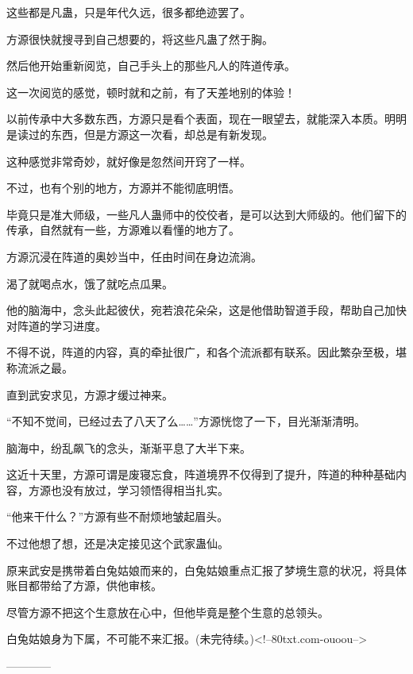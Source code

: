 \begin{this_body}
这些都是凡蛊，只是年代久远，很多都绝迹罢了。

方源很快就搜寻到自己想要的，将这些凡蛊了然于胸。

然后他开始重新阅览，自己手头上的那些凡人的阵道传承。

这一次阅览的感觉，顿时就和之前，有了天差地别的体验！

以前传承中大多数东西，方源只是看个表面，现在一眼望去，就能深入本质。明明是读过的东西，但是方源这一次看，却总是有新发现。

这种感觉非常奇妙，就好像是忽然间开窍了一样。

不过，也有个别的地方，方源并不能彻底明悟。

毕竟只是准大师级，一些凡人蛊师中的佼佼者，是可以达到大师级的。他们留下的传承，自然就有一些，方源难以看懂的地方了。

方源沉浸在阵道的奥妙当中，任由时间在身边流淌。

渴了就喝点水，饿了就吃点瓜果。

他的脑海中，念头此起彼伏，宛若浪花朵朵，这是他借助智道手段，帮助自己加快对阵道的学习进度。

不得不说，阵道的内容，真的牵扯很广，和各个流派都有联系。因此繁杂至极，堪称流派之最。

直到武安求见，方源才缓过神来。

“不知不觉间，已经过去了八天了么……”方源恍惚了一下，目光渐渐清明。

脑海中，纷乱飙飞的念头，渐渐平息了大半下来。

这近十天里，方源可谓是废寝忘食，阵道境界不仅得到了提升，阵道的种种基础内容，方源也没有放过，学习领悟得相当扎实。

“他来干什么？”方源有些不耐烦地皱起眉头。

不过他想了想，还是决定接见这个武家蛊仙。

原来武安是携带着白兔姑娘而来的，白兔姑娘重点汇报了梦境生意的状况，将具体账目都带给了方源，供他审核。

尽管方源不把这个生意放在心中，但他毕竟是整个生意的总领头。

白兔姑娘身为下属，不可能不来汇报。(未完待续。)<!--80txt.com-ouoou-->

------------

\end{this_body}

